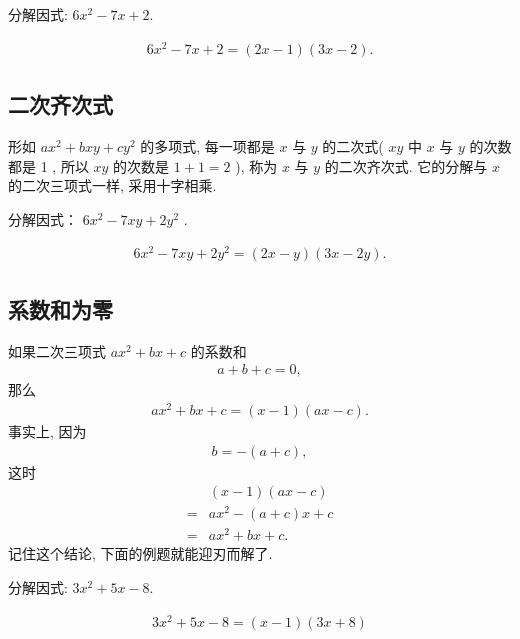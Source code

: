 \begin{example}[二次项系数不为 1]
	分解因式: $6 x^{2}-7 x+2$.
\end{example}
\begin{solution}
	\begin{align*}
		6 x^{2}-7 x+2=(2 x-1)(3 x-2).
	\end{align*}
\end{solution}

\subsection{二次齐次式}
形如 $a x^{2}+b x y+c y^{2}$ 的多项式, 每一项都是 $x$ 与 $y$ 的二次式( $x y$ 中 $x$ 与 $y$ 的次数都是 1 , 所以 $x y$ 的次数是 $1+1=2$ ), 称为 $x$ 与 $y$ 的二次齐次式. 它的分解与 $x$ 的二次三项式一样, 采用十字相乘.

\begin{example}
	分解因式： $6 x^{2}-7 x y+2 y^{2}$ .
\end{example}
\begin{solution}
	\begin{align*}
		6 x^{2}-7 x y+2 y^{2}=(2 x-y)(3 x-2 y).
	\end{align*}
\end{solution}

\subsection{系数和为零}
如果二次三项式 $a x^{2}+b x+c$ 的系数和
\begin{align*}
	a+b+c=0,
\end{align*}
那么
\begin{align*}
	a x^{2}+b x+c=(x-1)(a x-c) .
\end{align*}
事实上, 因为
\begin{align*}
	b=-(a+c),
\end{align*}
这时
\begin{align*}
	  & (x-1)(a x-c)      \\
	= & a x^{2}-(a+c) x+c \\
	= & a x^{2}+b x+c .
\end{align*}
记住这个结论, 下面的例题就能迎刃而解了.

\begin{example}
	分解因式: $3 x^{2}+5 x-8$.
\end{example}
\begin{solution}
	\begin{align*}
		3 x^{2}+5 x-8=(x-1)(3 x+8)
	\end{align*}
\end{solution}

